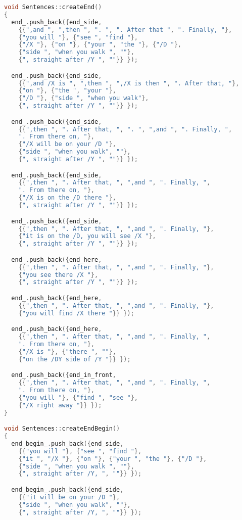 \begin{lstlisting}[language=C, basicstyle = \footnotesize, showstringspaces=false, stringstyle=\color{purple}]
void Sentences::createEnd()
{
  end_.push_back({end_side,
    {{",and ", ",then ", ". ", ". After that ", ". Finally, "}, 
    {"you will "}, {"see ", "find "},
    {"/X "}, {"on "}, {"your ", "the "}, {"/D "},
    {"side ", "when you walk ", ""}, 
    {", straight after /Y ", ""}} });

  end_.push_back({end_side,
    {{",and /X is ", ",then ", ",/X is then ", ". After that, "}, 
    {"on "}, {"the ", "your "},
    {"/D "}, {"side ", "when you walk"}, 
    {", straight after /Y ", ""}} });

  end_.push_back({end_side,
    {{",then ", ". After that, ", ". ", ",and ", ". Finally, ", 
    ". From there on, "}, 
    {"/X will be on your /D "}, 
    {"side ", "when you walk", ""}, 
    {", straight after /Y ", ""}} });

  end_.push_back({end_side,
    {{",then ", ". After that, ", ",and ", ". Finally, ", 
    ". From there on, "}, 
    {"/X is on the /D there "}, 
    {", straight after /Y ", ""}} });

  end_.push_back({end_side,
    {{",then ", ". After that, ", ",and ", ". Finally, "}, 
    {"it is on the /D, you will see /X "}, 
    {", straight after /Y ", ""}} });

  end_.push_back({end_here,
    {{",then ", ". After that, ", ",and ", ". Finally, "}, 
    {"you see there /X "}, 
    {", straight after /Y ", ""}} });

  end_.push_back({end_here,
    {{",then ", ". After that, ", ",and ", ". Finally, "}, 
    {"you will find /X there "}} });

  end_.push_back({end_here,
    {{",then ", ". After that, ", ",and ", ". Finally, ", 
    ". From there on, "}, 
    {"/X is "}, {"there ", ""}, 
    {"on the /DY side of /Y "}} });

  end_.push_back({end_in_front,
    {{",then ", ". After that, ", ",and ", ". Finally, ", 
    ". From there on, "}, 
    {"you will "}, {"find ", "see "}, 
    {"/X right away "}} });
}

void Sentences::createEndBegin()
{
  end_begin_.push_back({end_side,
    {{"you will "}, {"see ", "find "},
    {"it ", "/X "}, {"on "}, {"your ", "the "}, {"/D "},
    {"side ", "when you walk ", ""}, 
    {", straight after /Y, ", ""}} });

  end_begin_.push_back({end_side,
    {{"it will be on your /D "}, 
    {"side ", "when you walk", ""}, 
    {", straight after /Y, ", ""}} });


\end{lstlisting}
